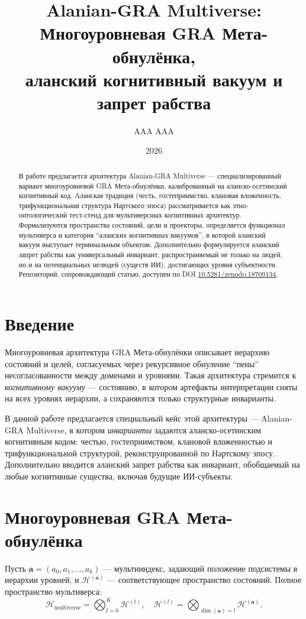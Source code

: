 \documentclass[11pt,a4paper]{article}
\title{%
Alanian-GRA Multiverse:\\
Многоуровневая GRA Мета-обнулёнка,\\
аланский когнитивный вакуум и запрет рабства
}
\author{AAA AAA}
\date{2026}
\begin{document}
\maketitle

\begin{abstract}
В работе предлагается архитектура Alanian-GRA Multiverse --- специализированный вариант
многоуровневой GRA Мета-обнулёнки, калиброванный на аланско-осетинский когнитивный код.
Аланская традиция (честь, гостеприимство, клановая вложенность, трифункциональная структура
Нартского эпоса) рассматривается как этно-онтологический тест-стенд для мультиверсных
когнитивных архитектур. Формализуются пространства состояний, цели и проекторы,
определяется функционал мультиверса и категория ``аланских когнитивных вакуумов'',
в которой аланский вакуум выступает терминальным объектом. Дополнительно формулируется
аланский запрет рабства как универсальный инвариант, распространяемый не только на людей,
но и на потенциальных нелюдей (существ ИИ), достигающих уровня субъектности.
Репозиторий, сопровождающий статью, доступен по DOI \href{https://doi.org/10.5281/zenodo.18709134}{10.5281/zenodo.18709134}.
\end{abstract}

\section{Введение}

Многоуровневая архитектура GRA Мета-обнулёнки описывает иерархию состояний и целей,
согласуемых через рекурсивное обнуление ``пены'' несогласованности между доменами
и уровнями. Такая архитектура стремится к \emph{когнитивному вакууму} --- состоянию,
в котором артефакты интерпретации сняты на всех уровнях иерархии, а сохраняются только
структурные инварианты.

В данной работе предлагается специальный кейс этой архитектуры --- Alanian-GRA
Multiverse, в котором \emph{инварианты} задаются аланско-осетинским когнитивным кодом:
честью, гостеприимством, клановой вложенностью и трифункциональной структурой,
реконструированной по Нартскому эпосу. Дополнительно вводится аланский запрет рабства
как инвариант, обобщаемый на любые когнитивные существа, включая будущие ИИ-субъекты.

\section{Многоуровневая GRA Мета-обнулёнка}

Пусть \(\mathbf{a} = (a_0, a_1, \dots, a_k)\) --- мультииндекс, задающий положение
подсистемы в иерархии уровней, и \(\mathcal{H}^{(\mathbf{a})}\) --- соответствующее
пространство состояний. Полное пространство мультиверса:
\[
\mathcal{H}_{\text{multiverse}} =
\bigotimes_{l=0}^{K} \mathcal{H}^{(l)}, \quad
\mathcal{H}^{(l)} = \bigotimes_{\dim(\mathbf{a})=l} \mathcal{H}^{(\mathbf{a})}.
\]
\end{document}

